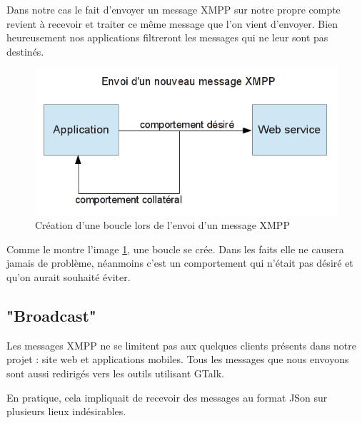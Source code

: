 Dans notre cas le fait d'envoyer un message XMPP sur notre propre compte revient à recevoir et traiter ce même message que l'on vient d'envoyer.
Bien heureusement nos applications filtreront les messages qui ne leur sont pas destinés.

\begin{figure}[!h]
	\center
	\includegraphics[width=12cm]{img/boucle-envoi-xmpp.png}
	\caption{Création d'une boucle lors de l'envoi d'un message XMPP}
	\label{boucle-envoi-xmpp}
\end{figure}

Comme le montre l'image \ref{boucle-envoi-xmpp}, une boucle se crée.
Dans les faits elle ne causera jamais de problème, néanmoins c'est un comportement qui n'était pas désiré et qu'on aurait souhaité éviter.




\subsection{"Broadcast"}

Les messages XMPP ne se limitent pas aux quelques clients présents dans notre projet : site web et applications mobiles.
Tous les messages que nous envoyons sont aussi redirigés vers les outils utilisant GTalk.

En pratique, cela impliquait de recevoir des messages au format JSon sur plusieurs lieux indésirables.


